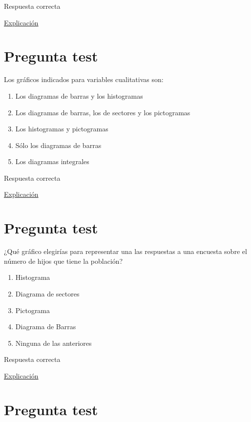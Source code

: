 \documentclass[
]{book}
\providecommand{\tightlist}{%
  \setlength{\itemsep}{0pt}\setlength{\parskip}{0pt}}
\begin{document}
Respuesta correcta

\href{https://1fjmanzano.github.io/bioestadistica/histogramas.html}{Explicación}

\hypertarget{pregunta-test-47}{%
\section{Pregunta test}\label{pregunta-test-47}}

Los gráficos indicados para variables cualitativas son:

\begin{enumerate}
\def\labelenumi{\alph{enumi})}
\tightlist
\item
  Los diagramas de barras y los histogramas
\item
  Los diagramas de barras, los de sectores y los pictogramas
\item
  Los histogramas y pictogramas
\item
  Sólo los diagramas de barras
\item
  Los diagramas integrales
\end{enumerate}

Respuesta correcta

\href{https://1fjmanzano.github.io/bioestadistica/diagramas-de-barras-y-sectores.html}{Explicación}

\hypertarget{pregunta-test-48}{%
\section{Pregunta test}\label{pregunta-test-48}}

¿Qué gráfico elegirías para representar una las respuestas a una encuesta sobre el número de hijos que tiene la población?

\begin{enumerate}
\def\labelenumi{\alph{enumi})}
\tightlist
\item
  Histograma
\item
  Diagrama de sectores
\item
  Pictograma
\item
  Diagrama de Barras
\item
  Ninguna de las anteriores
\end{enumerate}

Respuesta correcta

\href{https://1fjmanzano.github.io/bioestadistica/diagramas-de-barras-y-sectores.html}{Explicación}

\hypertarget{pregunta-test-49}{%
\section{Pregunta test}\label{pregunta-test-49}}
\end{document}
